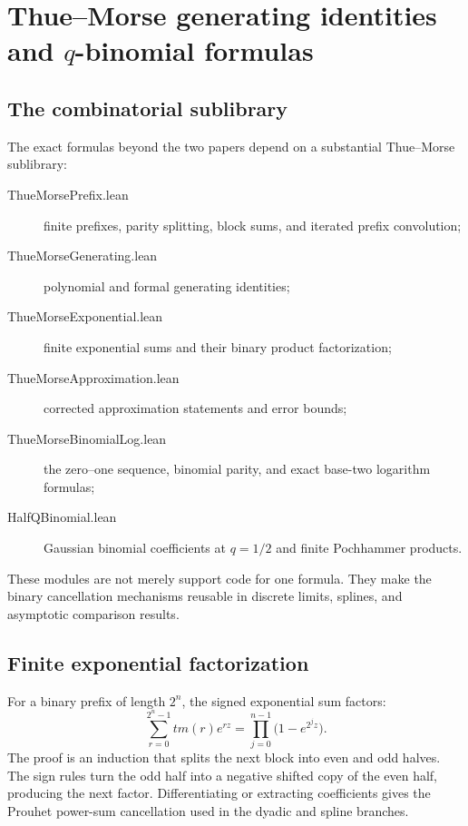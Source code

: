 \documentclass[11pt,a4paper,openany]{book}
\def\module#1{#1.lean}
\def\TM{tm}
\newcommand{\TM}{\ensuremath{\operatorname{tm}}}
\newcommand{\module}[1]{\nolinkurl{#1.lean}}
\begin{document}
\chapter{Thue--Morse generating identities and \texorpdfstring{$q$-binomial}{q-binomial} formulas}
\label{ch:qbinomial}

\section{The combinatorial sublibrary}
The exact formulas beyond the two papers depend on a substantial Thue--Morse
sublibrary:
\begin{description}
\item[\module{ThueMorsePrefix}] finite prefixes, parity splitting, block sums,
and iterated prefix convolution;
\item[\module{ThueMorseGenerating}] polynomial and formal generating
identities;
\item[\module{ThueMorseExponential}] finite exponential sums and their binary
product factorization;
\item[\module{ThueMorseApproximation}] corrected approximation statements and
error bounds;
\item[\module{ThueMorseBinomialLog}] the zero--one sequence, binomial parity,
and exact base-two logarithm formulas;
\item[\module{HalfQBinomial}] Gaussian binomial coefficients at $q=1/2$ and
finite Pochhammer products.
\end{description}
These modules are not merely support code for one formula.  They make the
binary cancellation mechanisms reusable in discrete limits, splines, and
asymptotic comparison results.

\section{Finite exponential factorization}
For a binary prefix of length $2^n$, the signed exponential sum factors:
\[
 \sum_{r=0}^{2^n-1}\TM(r)e^{rz}
   =\prod_{j=0}^{n-1}\bigl(1-e^{2^jz}\bigr).
\]
The proof is an induction that splits the next block into even and odd halves.
The sign rules turn the odd half into a negative shifted copy of the even half,
producing the next factor.  Differentiating or extracting coefficients gives
the Prouhet power-sum cancellation used in the dyadic and spline branches.
\end{document}
